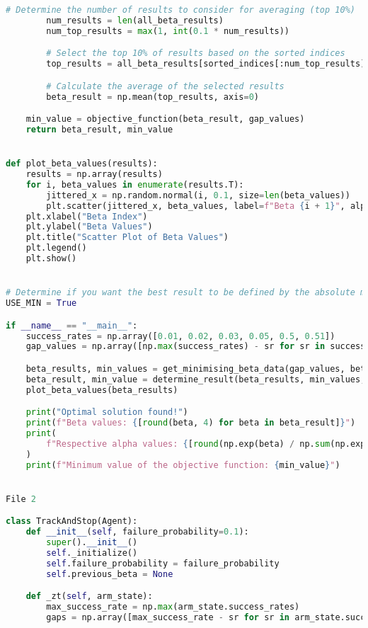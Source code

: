 {\begin{lstlisting}[language=Python]
        # Determine the number of results to consider for averaging (top 10%)
        num_results = len(all_beta_results)
        num_top_results = max(1, int(0.1 * num_results))

        # Select the top 10% of results based on the sorted indices
        top_results = all_beta_results[sorted_indices[:num_top_results]]

        # Calculate the average of the selected results
        beta_result = np.mean(top_results, axis=0)

    min_value = objective_function(beta_result, gap_values)
    return beta_result, min_value


def plot_beta_values(results):
    results = np.array(results)
    for i, beta_values in enumerate(results.T):
        jittered_x = np.random.normal(i, 0.1, size=len(beta_values))
        plt.scatter(jittered_x, beta_values, label=f"Beta {i + 1}", alpha=0.5, s=5)
    plt.xlabel("Beta Index")
    plt.ylabel("Beta Values")
    plt.title("Scatter Plot of Beta Values")
    plt.legend()
    plt.show()


# Determine if you want the best result to be defined by the absolute min or the average of the best 10%
USE_MIN = True

if __name__ == "__main__":
    success_rates = np.array([0.01, 0.02, 0.03, 0.05, 0.5, 0.51])
    gap_values = np.array([np.max(success_rates) - sr for sr in success_rates])

    beta_results, min_values = get_minimising_beta_data(gap_values, beta_prior=None)
    beta_result, min_value = determine_result(beta_results, min_values, gap_values)
    plot_beta_values(beta_results)

    print("Optimal solution found!")
    print(f"Beta values: {[round(beta, 4) for beta in beta_result]}")
    print(
        f"Respective alpha values: {[round(np.exp(beta) / np.sum(np.exp(beta_result)), 4) for beta in beta_result]}"
    )
    print(f"Minimum value of the objective function: {min_value}")


File 2

class TrackAndStop(Agent):
    def __init__(self, failure_probability=0.1):
        super().__init__()
        self._initialize()
        self.failure_probability = failure_probability
        self.previous_beta = None

    def _zt(self, arm_state):
        max_success_rate = np.max(arm_state.success_rates)
        gaps = np.array([max_success_rate - sr for sr in arm_state.success_rates])


\end{lstlisting}}

